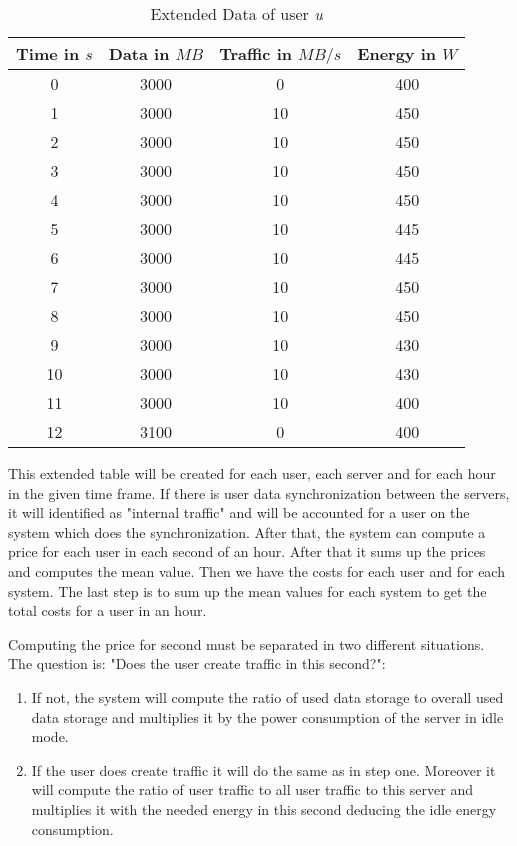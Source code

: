  
 \begin{table}
 \centering
 \caption{Extended Data of user \textit{u}}
 \begin{tabular}{|c|c|c|c|}
  \hline Time in $s$ & Data in $MB$ & Traffic in $MB/s$ & Energy in $W$ \\ 
   \hline 0 & 3000 & 0 & 400 \\ 
  \hline 1 & 3000 & 10 & 450 \\ 
  \hline 2 & 3000 & 10 & 450 \\ 
  \hline 3 & 3000 & 10 & 450\\ 
  \hline 4 & 3000 & 10 & 450 \\ 
  \hline 5 & 3000 & 10 & 445 \\
  \hline 6 & 3000 & 10 & 445 \\ 
  \hline 7 & 3000 & 10 & 450\\ 
  \hline 8 & 3000 & 10 & 450 \\ 
  \hline 9 & 3000 & 10 & 430 \\  
  \hline 10 & 3000 & 10 & 430 \\
   \hline 11 & 3000 & 10 & 400 \\
  \hline 12 & 3100 & 0 & 400 \\  
  \hline 
  \end{tabular}
  \label{tb2} 
  \end{table}
  
  This extended table will be created for each user, each server and for each hour in the given time frame. If there is user data synchronization between the servers, it will identified as "internal traffic" and will be accounted for a user on the system which does the synchronization. After that, the system can compute a price for each user in each second of an hour. After that it sums up the prices and computes the mean value. Then we have the costs for each user and for each system. The last step is to sum up the mean values for each system to get the total costs for a user in an hour.
  
  Computing the price for second must be separated in two different situations. The question is: "Does the user create traffic in this second?":
  \begin{enumerate}
	\item
	If not, the system will compute the ratio of used data storage to overall used data storage and multiplies it by the power consumption of the server in idle mode.
	\item
	If the user does create traffic it will do the same as in step one. Moreover it will compute the ratio of user traffic to all user traffic to this server and multiplies it with the needed energy in this second deducing the idle energy consumption.
  \end{enumerate}
  
